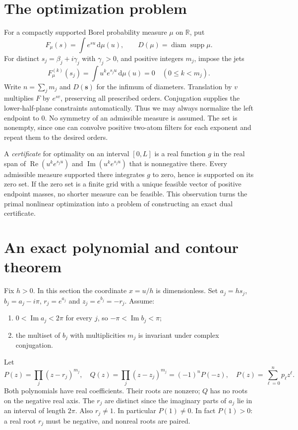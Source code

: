 \documentclass[11pt]{article}
\theoremstyle{remark}\newtheorem{remark}[theorem]{Remark}
\newcommand{\R}{\mathbb R}\newcommand{\C}{\mathbb C}\newcommand{\supp}{\operatorname{supp}}\newcommand{\diam}{\operatorname{diam}}\newcommand{\res}{\operatorname{Res}}\newcommand{\Ree}{\operatorname{Re}}\newcommand{\Imm}{\operatorname{Im}}\newcommand{\dd}{\,\mathrm d}
\begin{document}
\section{The optimization problem}
For a compactly supported Borel probability measure $\mu$ on $\R$, put
\[
 F_\mu(s)=\int e^{su}\dd\mu(u),\qquad D(\mu)=\diam\supp\mu.
\]
For distinct $s_j=\beta_j+i\gamma_j$ with $\gamma_j>0$, and positive integers $m_j$, impose the jets
\begin{equation}\label{eq:jets}
 F_\mu^{(k)}(s_j)=\int u^ke^{s_ju}\dd\mu(u)=0\quad (0\le k<m_j).
\end{equation}
Write $n=\sum_jm_j$ and $D(\boldsymbol{s})$ for the infimum of diameters. Translation by $v$ multiplies $F$ by $e^{sv}$, preserving all prescribed orders. Conjugation supplies the lower-half-plane constraints automatically. Thus we may always normalize the left endpoint to $0$. No symmetry of an admissible measure is assumed. The set is nonempty, since one can convolve positive two-atom filters for each exponent and repeat them to the desired orders.

A \emph{certificate} for optimality on an interval $[0,L]$ is a real function $g$ in the real span of $\Ree(u^ke^{s_ju})$ and $\Imm(u^ke^{s_ju})$ that is nonnegative there. Every admissible measure supported there integrates $g$ to zero, hence is supported on its zero set. If the zero set is a finite grid with a unique feasible vector of positive endpoint masses, no shorter measure can be feasible. This observation turns the primal nonlinear optimization into a problem of constructing an exact dual certificate.

\section{An exact polynomial and contour theorem}
Fix $h>0$. In this section the coordinate $x=u/h$ is dimensionless. Set $a_j=hs_j$, $b_j=a_j-i\pi$, $r_j=e^{a_j}$ and $z_j=e^{b_j}=-r_j$. Assume:
\begin{enumerate}[label=(M\arabic*),leftmargin=*]
\item $0<\Imm a_j<2\pi$ for every $j$, so $-\pi<\Imm b_j<\pi$;
\item the multiset of $b_j$ with multiplicities $m_j$ is invariant under complex conjugation.
\end{enumerate}
Let
\begin{equation}\label{eq:PQ}
 P(z)=\prod_j(z-r_j)^{m_j},\quad Q(z)=\prod_j(z-z_j)^{m_j}=(-1)^nP(-z),\quad P(z)=\sum_{\ell=0}^np_\ell z^\ell.
\end{equation}
Both polynomials have real coefficients. Their roots are nonzero; $Q$ has no roots on the negative real axis. The $r_j$ are distinct since the imaginary parts of $a_j$ lie in an interval of length $2\pi$. Also $r_j\ne1$. In particular $P(1)\ne0$. In fact $P(1)>0$: a real root $r_j$ must be negative, and nonreal roots are paired.
\end{document}

